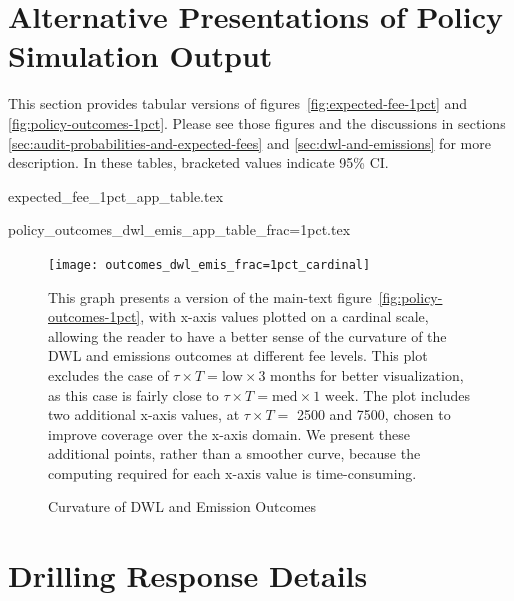 \documentclass[12pt,oneside,letterpaper]{article}
\theoremstyle{definition}
\begin{document}
\begin{refsection}



\newpage
\section{Alternative Presentations of Policy Simulation Output}
\label{app:tabular-policy-output}

This section provides tabular versions of figures~\ref{fig:expected-fee-1pct} and \ref{fig:policy-outcomes-1pct}.
Please see those figures and the discussions in sections
\ref{sec:audit-probabilities-and-expected-fees} and
\ref{sec:dwl-and-emissions} for more description.
In these tables, bracketed values indicate 95\% \gls{CI}.

{expected_fee_1pct_app_table.tex}


{policy_outcomes_dwl_emis_app_table_frac=1pct.tex}


\begin{figure}[!bthp]
  \caption{Curvature of \gls{DWL} and Emission Outcomes}
  \label{fig:policy-outcomes-1pct-cardinal}
  \texttt{[image: outcomes\_dwl\_emis\_frac=1pct\_cardinal]}

This graph presents a version of the main-text figure~\ref{fig:policy-outcomes-1pct}, with x-axis values plotted on a cardinal scale, allowing the reader to have a better sense of the curvature of the \gls{DWL} and emissions outcomes at different fee levels.
This plot excludes the case of \(\tau \times T = \text{low} \times \text{3 months}\) for better visualization, as this case is fairly close to \(\tau \times T = \text{med} \times \text{1 week}\).
The plot includes two additional x-axis values, at \(\tau \times T = \) 2500 and 7500, chosen to improve coverage over the x-axis domain.
We present these additional points, rather than a smoother curve, because the computing required for each x-axis value is time-consuming.
\end{figure}



\newpage
\section{Drilling Response Details}
\label{app:drilling-response-details}


\end{refsection}
\end{document}

